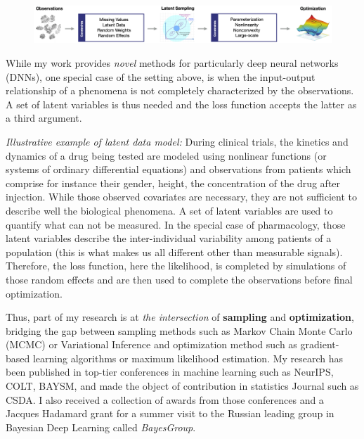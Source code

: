 \documentclass[twoside,11pt]{article}
\begin{document}
\begin{figure}[h]
\centering
\includegraphics[width=\textwidth]{fig_summary}
\end{figure}

While my work provides \emph{novel} methods for particularly deep neural networks (DNNs), one special case of the setting above, is when the input-output relationship of a phenomena is not completely characterized by the observations.
A set of latent variables is thus needed and the loss function accepts the latter as a third argument.

\textit{ Illustrative example of latent data model:} 
During clinical trials, the kinetics and dynamics of a drug being tested are modeled using nonlinear functions (or systems of ordinary differential equations) and observations from patients which comprise for instance their gender, height, the concentration of the drug after injection.
While those observed covariates are necessary, they are not sufficient to describe well the biological phenomena. 
A set of latent variables are used to quantify what can not be measured. 
In the special case of pharmacology, those latent variables describe the inter-individual variability among patients of a population (this is what makes us all different other than measurable signals). 
Therefore, the loss function, here the likelihood, is completed by simulations of those random effects and are then used to complete the observations before final optimization.

Thus, part of my research is at \emph{the intersection} of \textbf{sampling} and \textbf{optimization}, bridging the gap between sampling methods such as Markov Chain Monte Carlo (MCMC) or Variational Inference and optimization method such as gradient-based learning algorithms or maximum likelihood estimation.
My research has been published in top-tier conferences in machine learning such as NeurIPS, COLT, BAYSM, and made the object of contribution in statistics Journal such as CSDA. I also received a collection of awards from those conferences and a Jacques Hadamard grant for a summer visit to the Russian leading group in Bayesian Deep Learning called \emph{BayesGroup}.

\end{document}
